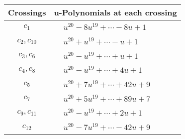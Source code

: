 \documentclass[1p]{elsarticle_modified}
\theoremstyle{definition}
\begin{document}
\begin{tabular}{m{50pt}|m{274pt}}
Crossings & \hspace{64pt}u-Polynomials at each crossing \\
\hline $$\begin{aligned}c_{1}\end{aligned}$$&$\begin{aligned}
&u^{20}-8 u^{19}+\cdots-8 u+1
\end{aligned}$\\
\hline $$\begin{aligned}c_{2},c_{10}\end{aligned}$$&$\begin{aligned}
&u^{20}+u^{19}+\cdots- u+1
\end{aligned}$\\
\hline $$\begin{aligned}c_{3},c_{6}\end{aligned}$$&$\begin{aligned}
&u^{20}- u^{19}+\cdots+u+1
\end{aligned}$\\
\hline $$\begin{aligned}c_{4},c_{8}\end{aligned}$$&$\begin{aligned}
&u^{20}- u^{19}+\cdots+4 u+1
\end{aligned}$\\
\hline $$\begin{aligned}c_{5}\end{aligned}$$&$\begin{aligned}
&u^{20}+7 u^{19}+\cdots+42 u+9
\end{aligned}$\\
\hline $$\begin{aligned}c_{7}\end{aligned}$$&$\begin{aligned}
&u^{20}+5 u^{19}+\cdots+89 u+7
\end{aligned}$\\
\hline $$\begin{aligned}c_{9},c_{11}\end{aligned}$$&$\begin{aligned}
&u^{20}- u^{19}+\cdots+2 u+1
\end{aligned}$\\
\hline $$\begin{aligned}c_{12}\end{aligned}$$&$\begin{aligned}
&u^{20}-7 u^{19}+\cdots-42 u+9
\end{aligned}$\\
\hline
\end{tabular}\\~\\
\end{document}
